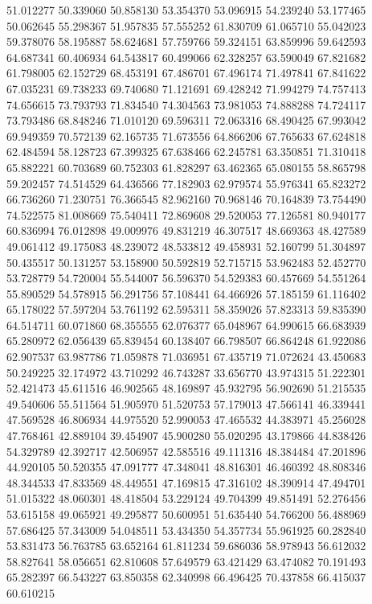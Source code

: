51.012277
50.339060
50.858130
53.354370
53.096915
54.239240
53.177465
50.062645
55.298367
51.957835
57.555252
61.830709
61.065710
55.042023
59.378076
58.195887
58.624681
57.759766
59.324151
63.859996
59.642593
64.687341
60.406934
64.543817
60.499066
62.328257
63.590049
67.821682
61.798005
62.152729
68.453191
67.486701
67.496174
71.497841
67.841622
67.035231
69.738233
69.740680
71.121691
69.428242
71.994279
74.757413
74.656615
73.793793
71.834540
74.304563
73.981053
74.888288
74.724117
73.793486
68.848246
71.010120
69.596311
72.063316
68.490425
67.993042
69.949359
70.572139
62.165735
71.673556
64.866206
67.765633
67.624818
62.484594
58.128723
67.399325
67.638466
62.245781
63.350851
71.310418
65.882221
60.703689
60.752303
61.828297
63.462365
65.080155
58.865798
59.202457
74.514529
64.436566
77.182903
62.979574
55.976341
65.823272
66.736260
71.230751
76.366545
82.962160
70.968146
70.164839
73.754490
74.522575
81.008669
75.540411
72.869608
29.520053
77.126581
80.940177
60.836994
76.012898
49.009976
49.831219
46.307517
48.669363
48.427589
49.061412
49.175083
48.239072
48.533812
49.458931
52.160799
51.304897
50.435517
50.131257
53.158900
50.592819
52.715715
53.962483
52.452770
53.728779
54.720004
55.544007
56.596370
54.529383
60.457669
54.551264
55.890529
54.578915
56.291756
57.108441
64.466926
57.185159
61.116402
65.178022
57.597204
53.761192
62.595311
58.359026
57.823313
59.835390
64.514711
60.071860
68.355555
62.076377
65.048967
64.990615
66.683939
65.280972
62.056439
65.839454
60.138407
66.798507
66.864248
61.922086
62.907537
63.987786
71.059878
71.036951
67.435719
71.072624
43.450683
50.249225
32.174972
43.710292
46.743287
33.656770
43.974315
51.222301
52.421473
45.611516
46.902565
48.169897
45.932795
56.902690
51.215535
49.540606
55.511564
51.905970
51.520753
57.179013
47.566141
46.339441
47.569528
46.806934
44.975520
52.990053
47.465532
44.383971
45.256028
47.768461
42.889104
39.454907
45.900280
55.020295
43.179866
44.838426
54.329789
42.392717
42.506957
42.585516
49.111316
48.384484
47.201896
44.920105
50.520355
47.091777
47.348041
48.816301
46.460392
48.808346
48.344533
47.833569
48.449551
47.169815
47.316102
48.390914
47.494701
51.015322
48.060301
48.418504
53.229124
49.704399
49.851491
52.276456
53.615158
49.065921
49.295877
50.600951
51.635440
54.766200
56.488969
57.686425
57.343009
54.048511
53.434350
54.357734
55.961925
60.282840
53.831473
56.763785
63.652164
61.811234
59.686036
58.978943
56.612032
58.827641
58.056651
62.810608
57.649579
63.421429
63.474082
70.191493
65.282397
66.543227
63.850358
62.340998
66.496425
70.437858
66.415037
60.610215
